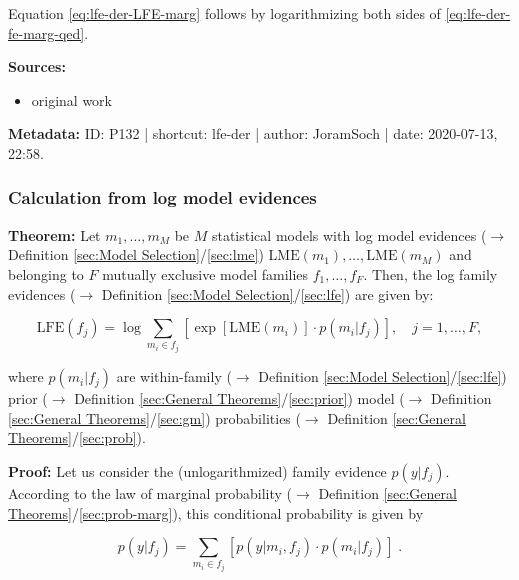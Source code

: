 \documentclass[a4paper,12pt,twoside]{book}
\begin{document}
Equation \eqref{eq:lfe-der-LFE-marg} follows by logarithmizing both sides of \eqref{eq:lfe-der-fe-marg-qed}.


\vspace{1em}
\textbf{Sources:}
\begin{itemize}
\item original work\end{itemize}


\vspace{1em}
\textbf{Metadata:} ID: P132 | shortcut: lfe-der | author: JoramSoch | date: 2020-07-13, 22:58.
\vspace{1em}



\subsubsection[\textbf{Calculation from log model evidences}]{Calculation from log model evidences} \label{sec:lfe-lme}
\setcounter{equation}{0}

\textbf{Theorem:} Let $m_1, \ldots, m_M$ be $M$ statistical models with log model evidences ($\rightarrow$ Definition \ref{sec:Model Selection}/\ref{sec:lme}) $\mathrm{LME}(m_1), \ldots, \mathrm{LME}(m_M)$ and belonging to $F$ mutually exclusive model families $f_1, \ldots, f_F$. Then, the log family evidences ($\rightarrow$ Definition \ref{sec:Model Selection}/\ref{sec:lfe}) are given by:

\begin{equation} \label{eq:lfe-lme-LFE-LME}
\mathrm{LFE}(f_j) = \log \sum_{m_i \in f_j} \left[ \exp[\mathrm{LME}(m_i)] \cdot p(m_i|f_j) \right], \quad j = 1, \ldots, F,
\end{equation}

where $p(m_i \vert f_j)$ are within-family ($\rightarrow$ Definition \ref{sec:Model Selection}/\ref{sec:lfe}) prior ($\rightarrow$ Definition \ref{sec:General Theorems}/\ref{sec:prior}) model ($\rightarrow$ Definition \ref{sec:General Theorems}/\ref{sec:gm}) probabilities ($\rightarrow$ Definition \ref{sec:General Theorems}/\ref{sec:prob}).


\vspace{1em}
\textbf{Proof:} Let us consider the (unlogarithmized) family evidence $p(y \vert f_j)$. According to the law of marginal probability ($\rightarrow$ Definition \ref{sec:General Theorems}/\ref{sec:prob-marg}), this conditional probability is given by

\begin{equation} \label{eq:lfe-lme-FE-ME-s1}
p(y|f_j) = \sum_{m_i \in f_j} \left[ p(y|m_i,f_j) \cdot p(m_i|f_j) \right] \; .
\end{equation}
\end{document}
